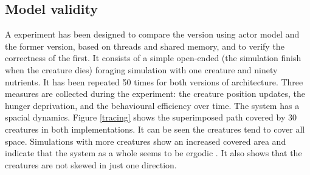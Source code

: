 \documentclass[runningheads]{llncs}
\begin{document}

\subsection{Model validity}
A experiment has been designed  to compare the version using actor model and the former version, based on threads and shared memory, and to verify the correctness of the first. It consists of a simple open-ended (the simulation finish when the creature dies) foraging simulation with one creature and ninety nutrients. It has been repeated 50 times for both versions of architecture. 
Three measures are collected during the experiment:  the creature position updates, the hunger deprivation, and the behavioural efficiency over time.
The system has a spacial dynamics. Figure \ref{tracing} shows the superimposed path covered by 30 creatures in both implementations. It can be seen the creatures tend to cover all space. Simulations with more creatures show an increased covered area and indicate that the system as a whole seems to be ergodic \cite{Cornfeld2012}. It also shows that the creatures are not skewed in just one direction.
\end{document}
